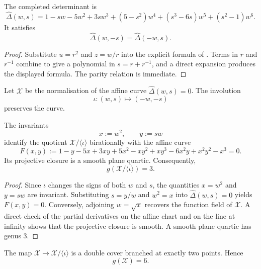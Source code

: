 \begin{proposition}
  \label{prop:sync-hatdelta-completion}
  The completed determinant is
  \[
    \widehat\Delta(w,s)
    =1-sw-5w^2+3sw^3+(5-s^2)w^4+(s^3-6s)w^5+(s^2-1)w^6.
  \]
  It satisfies
  \[
    \widehat\Delta(w,-s)=\widehat\Delta(-w,s).
  \]
\end{proposition}

\begin{proof}
Substitute \(u=r^2\) and \(z=w/r\) into the explicit formula of
. Terms in \(r\) and \(r^{-1}\)
combine to give a polynomial in \(s=r+r^{-1}\), and a direct expansion
produces the displayed formula. The parity relation is immediate.
\end{proof}

Let \(\mathcal X\) be the normalisation of the affine curve
\(\widehat\Delta(w,s)=0\). The involution
\[
  \iota:(w,s)\longmapsto(-w,-s)
\]
preserves the curve.

\begin{proposition}
  \label{prop:sync-hatdelta-quotient}
  The invariants
  \[
    x:=w^2,\qquad y:=sw
  \]
  identify the quotient \(\mathcal X/\langle\iota\rangle\) birationally
  with the affine curve
  \[
    F(x,y):=
    1-y-5x+3xy+5x^2-xy^2+xy^3-6x^2y+x^2y^2-x^3=0.
  \]
  Its projective closure is a smooth plane quartic. Consequently,
  \[
    g(\mathcal X/\langle\iota\rangle)=3.
  \]
\end{proposition}

\begin{proof}
Since \(\iota\) changes the signs of both \(w\) and \(s\), the
quantities \(x=w^2\) and \(y=sw\) are invariant. Substituting
\(s=y/w\) and \(w^2=x\) into \(\widehat\Delta(w,s)=0\) yields
\(F(x,y)=0\). Conversely, adjoining \(w=\sqrt{x}\) recovers the
function field of \(\mathcal X\). A direct check of the partial
derivatives on the affine chart and on the line at infinity shows that
the projective closure is smooth. A smooth plane quartic has genus \(3\).
\end{proof}

\begin{proposition}
  \label{prop:sync-hatdelta-double-cover}
  The map \(\mathcal X\to\mathcal X/\langle\iota\rangle\) is a double
  cover branched at exactly two points. Hence
  \[
    g(\mathcal X)=6.
  \]
\end{proposition}

